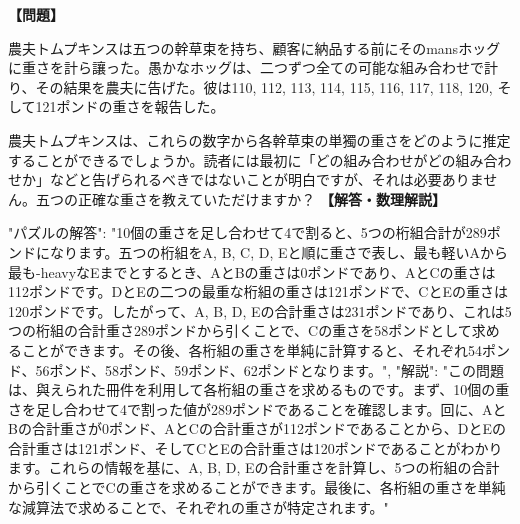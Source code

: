 \documentclass[10pt,a4paper,oneside,openany]{ltjsbook}
\begin{document}
\begin{tcolorbox}[colback=softblue,colframe=primaryblue,title=\textbf{第 101 問：THE TRUSSES OF HAY.},arc=2mm,boxrule=1pt,breakable]
\textbf{【問題】}\par\vspace{0.3em}
農夫トムプキンスは五つの幹草束を持ち、顧客に納品する前にそのmansホッグに重さを計ら讓った。愚かなホッグは、二つずつ全ての可能な組み合わせで計り、その結果を農夫に告げた。彼は110, 112, 113, 114, 115, 116, 117, 118, 120, そして121ポンドの重さを報告した。

農夫トムプキンスは、これらの数字から各幹草束の単獨の重さをどのように推定することができるでしょうか。読者には最初に「どの組み合わせがどの組み合わせか」などと告げられるべきではないことが明白ですが、それは必要ありません。五つの正確な重さを教えていただけますか？
\tcblower
\textbf{【解答・数理解説】}\par\vspace{0.3em}
{
"パズルの解答": "10個の重さを足し合わせて4で割ると、5つの桁組合計が289ポンドになります。五つの桁組をA, B, C, D, Eと順に重さで表し、最も軽いAから最も-heavyなEまでとするとき、AとBの重さは0ポンドであり、AとCの重さは112ポンドです。DとEの二つの最重な桁組の重さは121ポンドで、CとEの重さは120ポンドです。したがって、A, B, D, Eの合計重さは231ポンドであり、これは5つの桁組の合計重さ289ポンドから引くことで、Cの重さを58ポンドとして求めることができます。その後、各桁組の重さを単純に計算すると、それぞれ54ポンド、56ポンド、58ポンド、59ポンド、62ポンドとなります。",
"解説": "この問題は、與えられた冊件を利用して各桁組の重さを求めるものです。まず、10個の重さを足し合わせて4で割った値が289ポンドであることを確認します。回に、AとBの合計重さが0ポンド、AとCの合計重さが112ポンドであることから、DとEの合計重さは121ポンド、そしてCとEの合計重さは120ポンドであることがわかります。これらの情報を基に、A, B, D, Eの合計重さを計算し、5つの桁組の合計から引くことでCの重さを求めることができます。最後に、各桁組の重さを単純な減算法で求めることで、それぞれの重さが特定されます。"
}
\end{tcolorbox}
\end{document}
